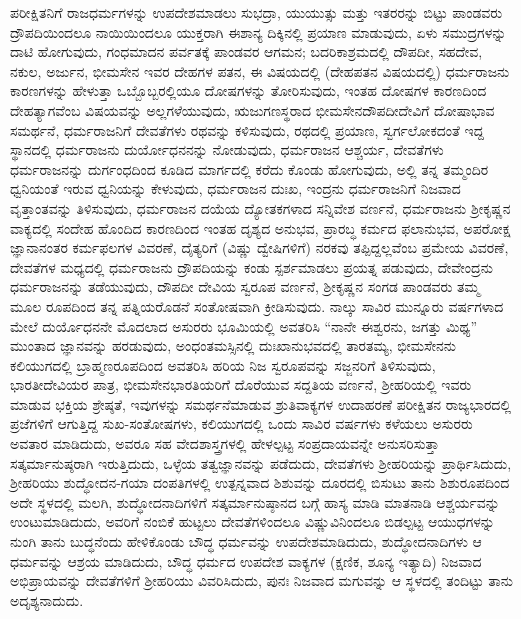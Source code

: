 ಪರೀಕ್ಷಿತನಿಗೆ ರಾಜಧರ್ಮಗಳನ್ನು ಉಪದೇಶಮಾಡಲು ಸುಭದ್ರಾ, ಯುಯುತ್ಸು ಮತ್ತು ಇತರರನ್ನು ಬಿಟ್ಟು ಪಾಂಡವರು ದ್ರೌಪದಿಯಿಂದಲೂ ನಾಯಿಯಿಂದಲೂ ಯುಕ್ತರಾಗಿ ಈಶಾನ್ಯ ದಿಕ್ಕಿನಲ್ಲಿ ಪ್ರಯಾಣ ಮಾಡುವುದು, ಏಳು ಸಮುದ್ರಗಳನ್ನು ದಾಟಿ ಹೋಗುವುದು, ಗಂಧ\-ಮಾದನ ಪರ್ವತಕ್ಕೆ ಪಾಂಡವರ ಆಗಮನ; ಬದರಿಕಾಶ್ರಮದಲ್ಲಿ ದೌಪದೀ, ಸಹದೇವ, ನಕುಲ, ಅರ್ಜುನ, ಭೀಮಸೇನ ಇವರ ದೇಹಗಳ ಪತನ, ಈ ವಿಷಯದಲ್ಲಿ (ದೇಹಪತನ ವಿಷಯದಲ್ಲಿ) ಧರ್ಮರಾಜನು ಕಾರಣಗಳನ್ನು ಹೇಳುತ್ತಾ ಒಬ್ಬೊಬ್ಬರಲ್ಲಿಯೂ ದೋಷಗಳನ್ನು ತೋರಿಸುವುದು, ಇಂತಹ ದೋಷಗಳ ಕಾರಣದಿಂದ ದೇಹತ್ಯಾಗವೆಂಬ ವಿಷಯವನ್ನು ಅಲ್ಲಗಳೆಯುವುದು, ಋಜುಗಣಸ್ಥರಾದ ಭೀಮಸೇನದೌಪದೀದೇವಿಗೆ ದೋಷಾಭಾವ ಸಮರ್ಥನೆ, ಧರ್ಮರಾಜನಿಗೆ ದೇವತೆಗಳು ರಥವನ್ನು ಕಳಿಸುವುದು, ರಥದಲ್ಲಿ ಪ್ರಯಾಣ, ಸ್ವರ್ಗಲೋಕದಂತೆ ಇದ್ದ ಸ್ಥಾನದಲ್ಲಿ ಧರ್ಮರಾಜನು ದುರ್ಯೋಧನನನ್ನು ನೋಡುವುದು, ಧರ್ಮರಾಜನ ಆಶ್ಚರ್ಯ, ದೇವತೆಗಳು ಧರ್ಮರಾಜನನ್ನು ದುರ್ಗಂಧದಿಂದ ಕೂಡಿದ ಮಾರ್ಗದಲ್ಲಿ ಕರೆದು ಕೊಂಡು ಹೋಗುವುದು, ಅಲ್ಲಿ ತನ್ನ ತಮ್ಮಂದಿರ ಧ್ವನಿಯಂತೆ ಇರುವ ಧ್ವನಿಯನ್ನು ಕೇಳುವುದು, ಧರ್ಮರಾಜನ ದುಃಖ, ಇಂದ್ರನು ಧರ್ಮರಾಜನಿಗೆ ನಿಜವಾದ ವೃತ್ತಾಂತವನ್ನು ತಿಳಿಸುವುದು, ಧರ್ಮರಾಜನ ದಯೆಯ ದ್ಯೋತಕಗಳಾದ ಸನ್ನಿವೇಶ ವರ್ಣನೆ, ಧರ್ಮರಾಜನು ಶ‍್ರೀಕೃಷ್ಣನ ವಾಕ್ಯದಲ್ಲಿ ಸಂದೇಹ ಹೊಂದಿದ ಕಾರಣದಿಂದ ಇಂತಹ ದೃಶ್ಯದ ಅನುಭವ, ಪ್ರಾರಬ್ಧ ಕರ್ಮದ ಫಲಾನುಭವ, ಅಪರೋಕ್ಷ ಜ್ಞಾನಾನಂತರ ಕರ್ಮಫಲಗಳ ವಿವರಣೆ, ದೈತ್ಯರಿಗೆ (ವಿಷ್ಣು ದ್ವೇಷಿಗಳಿಗೆ) ನರಕವು ತಪ್ಪಿದ್ದಲ್ಲವೆಂಬ ಪ್ರಮೇಯ ವಿವರಣೆ, ದೇವತೆಗಳ ಮಧ್ಯದಲ್ಲಿ ಧರ್ಮರಾಜನು ದ್ರೌಪದಿಯನ್ನು ಕಂಡು ಸ್ಪರ್ಶಮಾಡಲು ಪ್ರಯತ್ನ ಪಡುವುದು, ದೇವೇಂದ್ರನು ಧರ್ಮರಾಜನನ್ನು ತಡೆಯುವುದು, ದೌಪದೀ ದೇವಿಯ ಸ್ವರೂಪ ವರ್ಣನೆ, ಶ‍್ರೀಕೃಷ್ಣನ ಸಂಗಡ ಪಾಂಡವರು ತಮ್ಮ ಮೂಲ ರೂಪದಿಂದ ತನ್ನ ಪತ್ನಿಯರೊಡನೆ ಸಂತೋಷವಾಗಿ ಕ್ರೀಡಿಸುವುದು. ನಾಲ್ಕು ಸಾವಿರ ಮುನ್ನೂರು ವರ್ಷಗಳಾದ ಮೇಲೆ ದುರ್ಯೊಧನನೇ ಮೊದಲಾದ ಅಸುರರು ಭೂಮಿಯಲ್ಲಿ ಅವತರಿಸಿ “ನಾನೇ ಈಶ್ವರನು, ಜಗತ್ತು ಮಿಥ್ಯ” ಮುಂತಾದ ಜ್ಞಾನವನ್ನು ಹರಡುವುದು, ಅಂಧಂತಮಸ್ಸಿನಲ್ಲಿ ದುಃಖಾನುಭವದಲ್ಲಿ ತಾರತಮ್ಯ, ಭೀಮಸೇನನು ಕಲಿಯುಗದಲ್ಲಿ ಬ್ರಾಹ್ಮಣರೂಪದಿಂದ ಅವತರಿಸಿ ಹರಿಯ ನಿಜ ಸ್ವರೂಪವನ್ನು ಸಜ್ಜನರಿಗೆ ತಿಳಿಸುವುದು, ಭಾರತೀದೇವಿಯರ ಪಾತ್ರ, ಭೀಮಸೇನಭಾರತಿಯರಿಗೆ ದೊರೆಯುವ ಸದ್ದತಿಯ ವರ್ಣನೆ, ಶ‍್ರೀಹರಿಯಲ್ಲಿ ಇವರು ಮಾಡುವ ಭಕ್ತಿಯ ಶ್ರೇಷ್ಠತೆ, ಇವುಗಳನ್ನು ಸಮರ್ಥನೆಮಾಡುವ ಶ್ರುತಿವಾಕ್ಯಗಳ ಉದಾಹರಣೆ ಪರೀಕ್ಷಿತನ ರಾಜ್ಯಭಾರದಲ್ಲಿ ಪ್ರಜೆಗಳಿಗೆ ಆಗುತ್ತಿದ್ದ ಸುಖ-\-ಸಂತೋಷಗಳು, ಕಲಿಯುಗದಲ್ಲಿ ಒಂದು ಸಾವಿರ ವರ್ಷಗಳು ಕಳೆಯಲು ಅಸುರರು ಅವತಾರ ಮಾಡಿದುದು, ಅವರೂ ಸಹ ವೇದಶಾಸ್ತ್ರಗಳಲ್ಲಿ ಹೇಳಲ್ಪಟ್ಟ ಸಂಪ್ರದಾಯವನ್ನೇ ಅನುಸರಿಸುತ್ತಾ ಸತ್ಕರ್ಮಾನುಷ್ಠರಾಗಿ ಇರುತ್ತಿದುದು, ಒಳ್ಳೆಯ ತತ್ವಜ್ಞಾನವನ್ನು ಪಡೆದುದು, ದೇವತೆಗಳು ಶ‍್ರೀಹರಿಯನ್ನು ಪ್ರಾರ್ಥಿಸಿದುದು, ಶ‍್ರೀಹರಿಯು ಶುದ್ಧೋದನ-ಗಯಾ ದಂಪತಿಗಳಲ್ಲಿ ಉತ್ಪನ್ನವಾದ ಶಿಶುವನ್ನು ದೂರದಲ್ಲಿ ಬಿಸುಟು ತಾನು ಶಿಶುರೂಪದಿಂದ ಅದೇ ಸ್ಥಳದಲ್ಲಿ ಮಲಗಿ, ಶುದ್ಧೋದನಾದಿಗಳಿಗೆ ಸತ್ಕರ್ಮಾನುಷ್ಠಾನದ ಬಗ್ಗೆ ಹಾಸ್ಯ ಮಾಡಿ ಮಾತನಾಡಿ ಆಶ್ಚರ್ಯವನ್ನು ಉಂಟುಮಾಡಿದುದು, ಅವರಿಗೆ ನಂಬಿಕೆ ಹುಟ್ಟಲು ದೇವತೆಗಳಿಂದಲೂ ವಿಷ್ಣುವಿ\-ನಿಂದಲೂ ಬಿಡಲ್ಪಟ್ಟ ಆಯುಧಗಳನ್ನು ನುಂಗಿ ತಾನು ಬುದ್ಧನೆಂದು ಹೇಳಿಕೊಂಡು ಬೌದ್ಧ ಧರ್ಮವನ್ನು ಉಪದೇಶಮಾಡಿದುದು, ಶುದ್ಧೋದನಾದಿಗಳು ಆ ಧರ್ಮವನ್ನು ಆಶ್ರಯ ಮಾಡಿದುದು, ಬೌದ್ಧ ಧರ್ಮದ ಉಪದೇಶ ವಾಕ್ಯಗಳ (ಕ್ಷಣಿಕ, ಶೂನ್ಯ ಇತ್ಯಾದಿ) ನಿಜವಾದ ಅಭಿಪ್ರಾಯವನ್ನು ದೇವತೆಗಳಿಗೆ ಶ‍್ರೀಹರಿಯು ವಿವರಿಸಿದುದು, ಪುನಃ ನಿಜವಾದ ಮಗುವನ್ನು ಆ ಸ್ಥಳದಲ್ಲಿ ತಂದಿಟ್ಟು ತಾನು ಅದೃಶ್ಯನಾದುದು.

